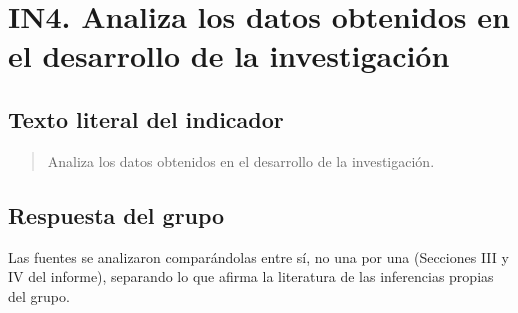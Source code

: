 \section*{IN4. Analiza los datos obtenidos en el desarrollo de la investigación}

\subsection*{Texto literal del indicador}
\begin{quote}
Analiza los datos obtenidos en el desarrollo de la investigación.
\end{quote}

\subsection*{Respuesta del grupo}
Las fuentes se analizaron comparándolas entre sí, no una por una (Secciones III y IV del informe), separando lo que afirma la literatura de las inferencias propias del grupo.

